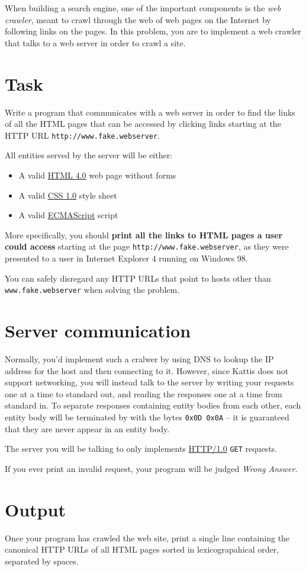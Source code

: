 When building a search engine, one of the important components is the \emph{web crawler}, meant to crawl through the web of web pages on the Internet by following links on the pages.
In this problem, you are to implement a web crawler that talks to a web server in order to crawl a site.

\section*{Task}
Write a program that communicates with a web server in order to find the links of all the HTML pages that can be accessed by clicking links starting at the HTTP URL \texttt{http://www.fake.webserver}.

All entities served by the server will be either:
\begin{itemize}
\item A valid \href{https://www.w3.org/TR/1998/REC-html40-19980424/}{HTML 4.0} web page without forms
\item A valid \href{https://www.w3.org/TR/CSS1/}{CSS 1.0} style sheet
\item A valid \href{https://www.ecma-international.org/publications/files/ECMA-ST-ARCH/ECMA-262,\%201st\%20edition,\%20June\%201997.pdf}{ECMAScript} script
\end{itemize}

More specifically, you should \textbf{print all the links to HTML pages a user could access} starting at the page \texttt{http://www.fake.webserver}, as they were presented to a user in Internet Explorer 4 running on Windows 98.

You can safely disregard any HTTP URLs that point to hosts other than \texttt{www.fake.webserver} when solving the problem.

\section*{Server communication}
Normally, you'd implement such a cralwer by using DNS to lookup the IP address for the host and then connecting to it.
However, since Kattis does not support networking, you will instead talk to the server by writing your requests one at a time to standard out, and reading the responses one at a time from standard in. To separate responses containing entity bodies from each other, each entity body will be terminated by with the bytes \texttt{0x0D 0x0A} -- it is guaranteed that they are never appear in an entity body.

The server you will be talking to only implements \href{https://www.w3.org/Protocols/HTTP/1.0/spec.html}{HTTP/1.0} \texttt{GET} requests.

If you ever print an invalid request, your program will be judged \emph{Wrong Answer}.

\section*{Output}
Once your program has crawled the web site, print a single line containing the canonical HTTP URLs of all HTML pages sorted in lexicograpahical order, separated by spaces.
